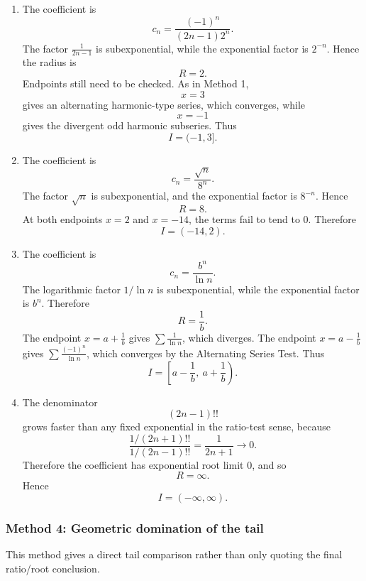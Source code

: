\documentclass[12pt]{article}
\begin{document}
\begin{enumerate}[label=(\alph*)]
\item The coefficient is
\[
c_n=\frac{(-1)^n}{(2n-1)2^n}.
\]
The factor \(\frac1{2n-1}\) is subexponential, while the exponential factor is \(2^{-n}\). Hence the radius is
\[
R=2.
\]
Endpoints still need to be checked. As in Method 1,
\[
x=3
\]
gives an alternating harmonic-type series, which converges, while
\[
x=-1
\]
gives the divergent odd harmonic subseries. Thus
\[
\boxed{I=(-1,3]}.
\]

\item The coefficient is
\[
c_n=\frac{\sqrt n}{8^n}.
\]
The factor \(\sqrt n\) is subexponential, and the exponential factor is \(8^{-n}\). Hence
\[
R=8.
\]
At both endpoints \(x=2\) and \(x=-14\), the terms fail to tend to \(0\). Therefore
\[
\boxed{I=(-14,2)}.
\]

\item The coefficient is
\[
c_n=\frac{b^n}{\ln n}.
\]
The logarithmic factor \(1/\ln n\) is subexponential, while the exponential factor is \(b^n\). Therefore
\[
R=\frac1b.
\]
The endpoint \(x=a+\frac1b\) gives \(\sum \frac1{\ln n}\), which diverges. The endpoint \(x=a-\frac1b\) gives \(\sum \frac{(-1)^n}{\ln n}\), which converges by the Alternating Series Test. Thus
\[
\boxed{I=\left[a-\frac1b,\ a+\frac1b\right)}.
\]

\item The denominator
\[
(2n-1)!!
\]
grows faster than any fixed exponential in the ratio-test sense, because
\[
\frac{1/(2n+1)!!}{1/(2n-1)!!}
=
\frac1{2n+1}\to0.
\]
Therefore the coefficient has exponential root limit \(0\), and so
\[
R=\infty.
\]
Hence
\[
\boxed{I=(-\infty,\infty)}.
\]
\end{enumerate}

\newpage
\subsubsection*{Method 4: Geometric domination of the tail}
This method gives a direct tail comparison rather than only quoting the final ratio/root conclusion.
\end{document}
